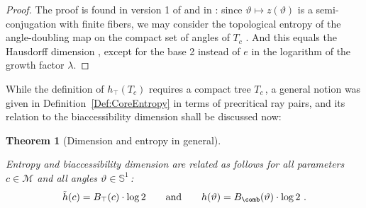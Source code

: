 \documentclass[12pt]{amsart}
\newcommand{\Circle}{\mathbb S^1}
\newcommand{\0}{\texttt{0}}
\newcommand{\1}{\texttt{1}}
\newtheorem{theorem}{Theorem}[section]
\theoremstyle{definition}
\numberwithin{equation}{section}
\renewcommand{\theta}{\vartheta}
\newcommand{\lineclear}{\rule{0pt}{2pt}\newline}
\begin{document}
\begin{proof}
The proof is found in version 1 of \cite{BruinSchleicher} and in
\cite{TiozzoThesis, Jung}:
since $\theta\mapsto z(\theta)$ is a semi-conjugation with finite fibers, we may
consider the topological entropy of the angle-doubling map on the compact set
of angles of $T_c$ \cite[Thm.~II.7.1]{deMelovanStrien}. And this equals the
Hausdorff dimension \cite[Proposition~III.1]{Furstenberg}, except for the
base 2 instead of $e$ in the logarithm of the growth factor $\lambda$. 
\end{proof}

While the definition of $h_\top(T_c)$ requires a compact tree $T_c$\,,
a general notion was given in Definition~\ref{Def:CoreEntropy} in terms
of precritical ray pairs, and its relation to the biaccessibility dimension
shall be discussed now:

\begin{theorem}[Dimension and entropy in general]
\label{Thm:Biaccessibility} \lineclear
Entropy and biaccessibility dimension are related as follows for
all parameters $c\in\mathcal{M}$ and all angles $\theta\in \Circle$\,:
\begin{equation}
\tilde h(c)=B_\top(c)\cdot\log2
\qquad\mbox{and}\qquad
h(\theta)=B_\comb(\theta)\cdot\log2 \ .
\end{equation}
\end{theorem}
\end{document}
